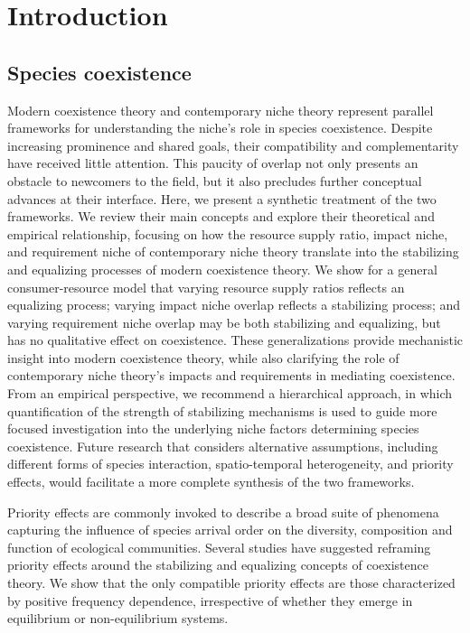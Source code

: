 \chapter{Introduction}
\fancyhead[LE, RO]{\thepage}
\fancyfoot{}
\renewcommand{\headrulewidth}{0pt}



\section{Species coexistence}
Modern coexistence theory and contemporary niche theory represent parallel frameworks for understanding the niche's role in species coexistence. Despite increasing prominence and shared goals, their compatibility and complementarity have received little attention. This paucity of overlap not only presents an obstacle to newcomers to the field, but it also precludes further conceptual advances at their interface. Here, we present a synthetic treatment of the two frameworks. We review their main concepts and explore their theoretical and empirical relationship, focusing on how the resource supply ratio, impact niche, and requirement niche of contemporary niche theory translate into the stabilizing and equalizing processes of modern coexistence theory. We show for a general consumer-resource model that varying resource supply ratios reflects an equalizing process; varying impact niche overlap reflects a stabilizing process; and varying requirement niche overlap may be both stabilizing and equalizing, but has no qualitative effect on coexistence. These generalizations provide mechanistic insight into modern coexistence theory, while also clarifying the role of contemporary niche theory's impacts and requirements in mediating coexistence. From an empirical perspective, we recommend a hierarchical approach, in which quantification of the strength of stabilizing mechanisms is used to guide more focused investigation into the underlying niche factors determining species coexistence. Future research that considers alternative assumptions, including different forms of species interaction, spatio-temporal heterogeneity, and priority effects, would facilitate a more complete synthesis of the two frameworks.
\par


Priority effects are commonly invoked to describe a broad suite of phenomena capturing the influence of species arrival order on the diversity, composition and function of ecological communities. Several studies have suggested reframing priority effects around the stabilizing and equalizing concepts of coexistence theory. We show that the only compatible priority effects are those characterized by positive frequency dependence, irrespective of whether they emerge in equilibrium or non-equilibrium systems. 
\par



